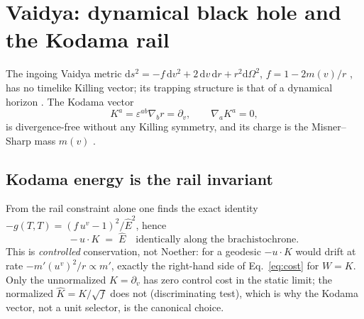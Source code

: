 \documentclass[12pt]{iopart}
\newcommand{\Ehat}{\hat E}
\newcommand{\dd}{\mathrm{d}}
\begin{document}
\section{Vaidya: dynamical black hole and the Kodama rail}
\label{sec:vaidya}
The ingoing Vaidya metric $\dd s^2=-f\,\dd v^2+2\,\dd v\,\dd r+r^2\dd\Omega^2$,
$f=1-2m(v)/r$ \cite{Vaidya1951,LindquistSchwartzMisner1965}, has no timelike
Killing vector; its trapping structure is that of a dynamical horizon
\cite{AshtekarKrishnan2003,Booth2005,FaraoniBook}. The Kodama vector
\cite{Kodama1980,Hayward1996,AbreuVisser2010}
\begin{equation}
    K^a=\varepsilon^{ab}\nabla_b r = \partial_v ,\qquad
    \nabla_a K^a=0,
    \label{eq:kodama}
\end{equation}
is divergence-free without any Killing symmetry, and its charge is the
Misner--Sharp mass $m(v)$ \cite{MisnerSharp1964,HaywardMukohyama1999}.

\subsection{Kodama energy is the rail invariant}
\label{sec:kodama-energy}
From the rail constraint alone one finds the exact identity
$-g(T,T)=(f\,u^v-1)^2/\Ehat^2$, hence
\begin{equation}
    -\,u\cdot K \;=\; \Ehat \quad\text{identically along the brachistochrone.}
    \label{eq:kodama-conserved}
\end{equation}
This is \emph{controlled} conservation, not Noether: for a geodesic
$-u\cdot K$ would drift at rate $-m'(u^v)^2/r\propto m'$, exactly the
right-hand side of Eq.~\eqref{eq:cost} for $W=K$. Only the unnormalized
$K=\partial_v$ has zero control cost in the static limit; the normalized
$\hat K=K/\sqrt f$ does not (discriminating test), which is why the Kodama
vector, not a unit selector, is the canonical choice.
\end{document}
